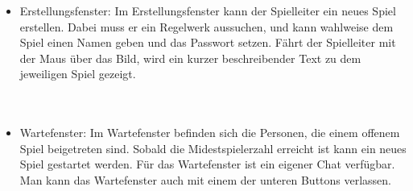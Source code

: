 \documentclass{article}
\begin{document}
\begin{itemize}
		\newpage
	\item \gls{Erstellungsfenster}: Im \gls{Erstellungsfenster} kann der \gls{Spielleiter} ein neues Spiel erstellen. Dabei muss er ein 			\gls{Regelwerk} aussuchen, und kann wahlweise dem Spiel einen Namen geben und das Passwort setzen. Fährt 					der \gls{Spielleiter} mit der Maus über das Bild, wird ein kurzer beschreibender Text zu dem jeweiligen Spiel 					gezeigt.\\
		\ \\
		\ \\
	\item \gls{Wartefenster}: Im \gls{Wartefenster} befinden sich die Personen, die einem offenem Spiel beigetreten sind. Sobald 					die Midestspielerzahl erreicht ist kann ein neues Spiel gestartet werden. Für das Wartefenster ist ein eigener 					Chat verfügbar. Man kann das Wartefenster auch mit einem der unteren Buttons verlassen. \\
		\ \\

\end{itemize}
\end{document}
